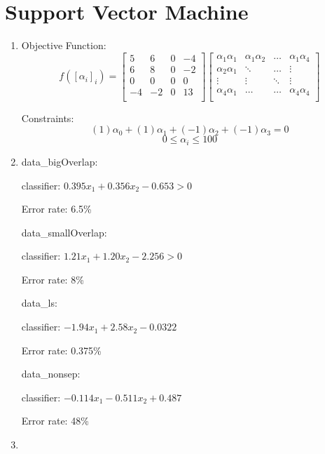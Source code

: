 \documentclass{paper}
\begin{document}
\section{Support Vector Machine}

\begin{enumerate}
    \item

    Objective Function:
    \begin{equation*}
f([\alpha_i]_i) = \begin{bmatrix}
5 & 6 & 0 & -4 \\
6 & 8 & 0 & -2 \\
0 & 0 & 0 & 0 \\
-4 & -2 & 0 & 13 \\
    \end{bmatrix} \begin{bmatrix}
\alpha_1\alpha_1 & \alpha_1\alpha_2 & \hdots & \alpha_1\alpha_4 \\
\alpha_2\alpha_1 & \ddots & \hdots & \vdots \\
\vdots & \vdots & \ddots & \vdots \\
\alpha_4\alpha_1 & \hdots & \hdots & \alpha_4\alpha_4 \\
    \end{bmatrix}
 \end{equation*}

Constraints:
\[
(1)\alpha_0 +
(1)\alpha_1 +
(-1)\alpha_2 +
(-1)\alpha_3 = 0 \]
\[  0 \le \alpha_i \le 100 \]

    \item 
data\_bigOverlap:

    classifier: $0.395 x_1 + 0.356 x_2 - 0.653 > 0$

Error rate: 6.5\%



data\_smallOverlap:

classifier:  $1.21 x_1 + 1.20 x_2 - 2.256 > 0$

Error rate: 8\%



data\_ls:

classifier: $-1.94 x_1 + 2.58 x_2 - 0.0322$

Error rate: 0.375\%



data\_nonsep:

classifier: $-0.114 x_1 -0.511 x_2 + 0.487$

Error rate: 48\%

    \item
    \begin{enumerate}


\end{enumerate}
\end{enumerate}
\end{document}
